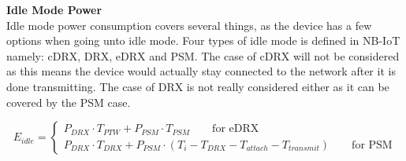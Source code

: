\begin{table}[H]
\centering
{}
\caption{Paremeter overview for disconnection energy.}
\label{tab:Erelease_parameter_overview}
\end{table}

\textbf{Idle Mode Power}\\
Idle mode power consumption covers several things, as the device has a few options when going unto idle mode. Four types of idle mode is defined in \gls{NB-IoT} namely: \gls{cDRX}, \gls{DRX}, \gls{eDRX} and \gls{PSM}. The case of cDRX will not be considered as this means the device would actually stay connected to the network after it is done transmitting. The case of DRX is not really considered either as it can be covered by the PSM case. 
  
\begin{equation}
E_{idle} = \begin{cases} P_{DRX}\cdot T_{PTW}+P_{PSM}\cdot T_{PSM} \qquad \text{for eDRX}\\
			 P_{DRX}\cdot T_{DRX} + P_{PSM}\cdot (T_i-T_{DRX}-T_{attach}-T_{transmit}) \qquad \text{for PSM}
		   \end{cases}
\end{equation}
\begin{where}
\end{where}

